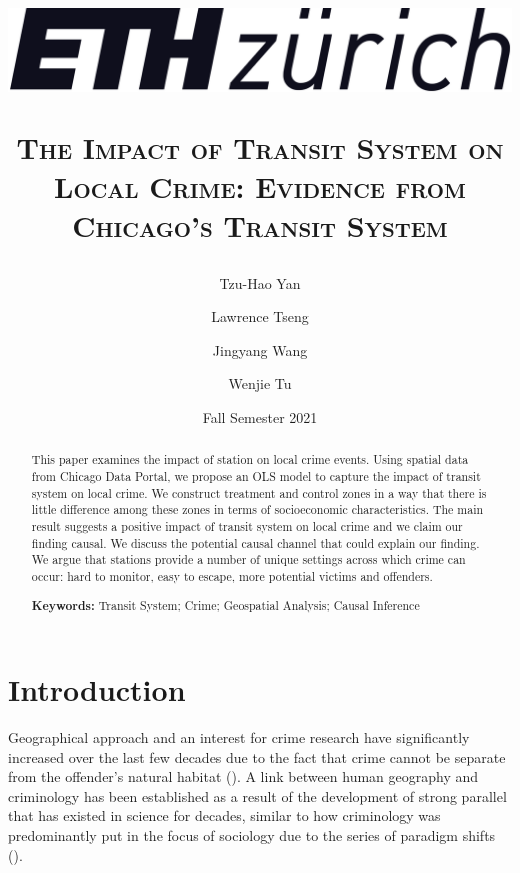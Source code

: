 \documentclass[a4paper, 11pt]{article}
\title{%
\begin{center}
    \includegraphics[scale=0.1]{images/ETH.png}
\end{center}
\vspace{4em}
    \textsc{The Impact of Transit System on Local Crime: Evidence from Chicago's Transit System}
}
\author{Tzu-Hao Yan \and Lawrence Tseng \and Jingyang Wang \and Wenjie Tu}
\date{Fall Semester 2021}
\begin{document}
\clearpage
\maketitle
\thispagestyle{empty}


\begin{abstract}
\noindent This paper examines the impact of station on local crime events. Using spatial data from Chicago Data Portal, we propose an OLS model to capture the impact of transit system on local crime. We construct treatment and control zones in a way that there is little difference among these zones in terms of socioeconomic characteristics. The main result suggests a positive impact of transit system on local crime and we claim our finding causal. We discuss the potential causal channel that could explain our finding. We argue that stations provide a number of unique settings across which crime can occur: hard to monitor, easy to escape, more potential victims and offenders.

\vspace{4mm}

\noindent\textbf{Keywords:} Transit System; Crime; Geospatial Analysis; Causal Inference

\end{abstract}




\newpage
\setcounter{page}{1}
\doublespacing


\section{Introduction} \label{sec:introduction}

Geographical approach and an interest for crime research have significantly increased over the last few decades due to the fact that crime cannot be separate from the offender’s natural habitat (\cite{herchenrader2015}). A link between human geography and criminology has been established as a result of the development of strong parallel that has existed in science for decades, similar to how criminology was predominantly put in the focus of sociology due to the series of paradigm shifts (\cite{butorac2017}). 

\end{document}
